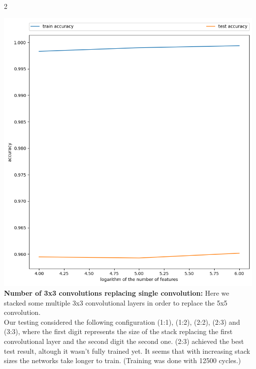 \documentclass{article}
\begin{document}
\begin{ukon-infie}[3.12.17]{2}
\begin{exercise}[p=55]{}
{			\includegraphics[scale=1.1]{featurecount.png}\\
			
			\textbf{Number of 3x3 convolutions replacing single convolution:}
			Here we stacked some multiple 3x3 convolutional layers in order to replace the 5x5 convolution.\\
			Our testing considered the following configuration (1:1), (1:2), (2:2), (2:3) and (3:3), where the first digit represents the size of the stack replacing the first convolutional layer and the second digit the second one. (2:3) achieved the best test result, altough it wasn't fully trained yet. It seems that with increasing stack sizes the networks take longer to train. (Training was done with 12500 cycles.)\\
			
}
\end{exercise}
\end{ukon-infie}
\end{document}
